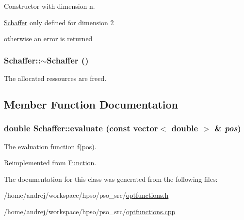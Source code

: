 Constructor with dimension n. 

\hyperlink{classSchaffer}{Schaffer} only defined for dimension 2\par
 otherwise an error is returned \hypertarget{classSchaffer_afa81a2b57a56c9b225f04fe80fccd19}{
\subsubsection{\setlength{\rightskip}{0pt plus 5cm}Schaffer::$\sim$Schaffer ()}}
\label{classSchaffer_afa81a2b57a56c9b225f04fe80fccd19}


The allocated ressources are freed. 



\subsection{Member Function Documentation}
\hypertarget{classSchaffer_7112daf77ee0a64dab7c86de90a534dd}{
\subsubsection{\setlength{\rightskip}{0pt plus 5cm}double Schaffer::evaluate (const vector$<$ double $>$ \& {\em pos})}}
\label{classSchaffer_7112daf77ee0a64dab7c86de90a534dd}


The evaluation function f(pos). 



Reimplemented from \hyperlink{classFunction_159260a1fc3afa8932491e4057b6b844}{Function}.

The documentation for this class was generated from the following files:\begin{CompactItemize}
\item 
/home/andrej/workspace/hpso/pso\_\-src/\hyperlink{optfunctions_8h}{optfunctions.h}\item 
/home/andrej/workspace/hpso/pso\_\-src/\hyperlink{optfunctions_8cpp}{optfunctions.cpp}\end{CompactItemize}
